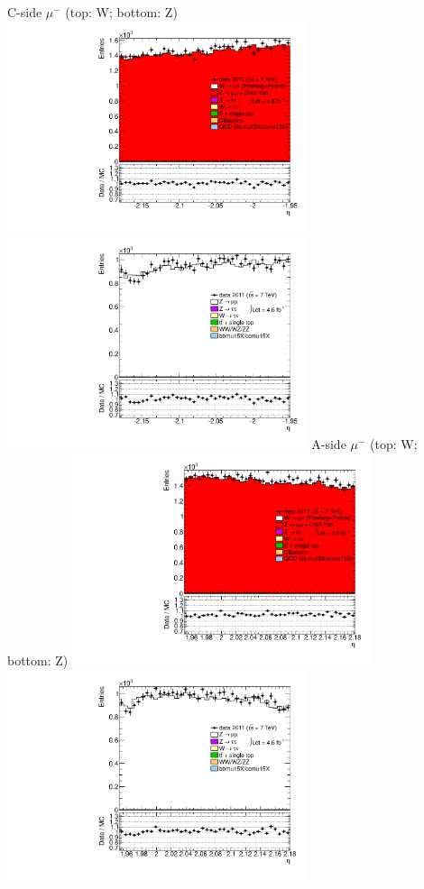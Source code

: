  {
\colb[T]
C-side $\mu^{-}$ (top: W; bottom: Z)
\centering
\includegraphics[width=0.66\textwidth]{dates/20130306/figures/both/Wzlike_10_C_stack_l_eta_NEG} \\
\includegraphics[width=0.66\textwidth]{dates/20130306/figures/both/Z_10_C_stack_lN_eta_ALL.pdf}
A-side $\mu^{-}$ (top: W; bottom: Z)
\centering
\includegraphics[width=0.66\textwidth]{dates/20130306/figures/both/Wzlike_10_A_stack_l_eta_NEG} \\
\includegraphics[width=0.66\textwidth]{dates/20130306/figures/both/Z_10_A_stack_lN_eta_ALL.pdf} 
\cole
}

